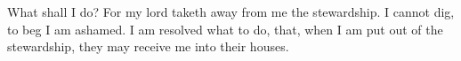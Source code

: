 What shall I do? For my lord taketh away from me the stewardship. I cannot dig, to beg I am ashamed. I am resolved what to do, that, when I am put out of the stewardship, they may receive me into their houses.
